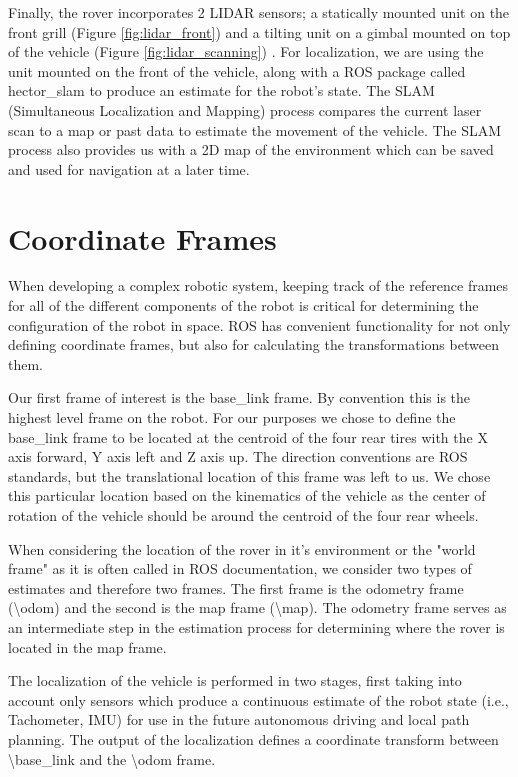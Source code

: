 Finally, the rover incorporates 2 LIDAR sensors; a statically mounted unit on the front grill (Figure \ref{fig:lidar_front}) and a tilting unit on a gimbal mounted on top of the vehicle (Figure \ref{fig:lidar_scanning}) . For localization, we are using the unit mounted on the front of the vehicle, along with a ROS package called hector\_slam to produce an estimate for the robot's state. The SLAM (Simultaneous Localization and Mapping) process compares the current laser scan to a map or past data to estimate the movement of the vehicle. The SLAM process also provides us with a 2D map of the environment which can be saved and used for navigation at a later time.

\section{Coordinate Frames}

When developing a complex robotic system, keeping track of the reference frames for all of the different components of the robot is critical for determining the configuration of the robot in space. ROS has convenient functionality for not only defining coordinate frames, but also for calculating the transformations between them. 

Our first frame of interest is the base\_link frame. By convention this is the highest level frame on the robot. For our purposes we chose to define the base\_link frame to be located at the centroid of the four rear tires with the X axis forward, Y axis left and Z axis up. The direction conventions are ROS standards, but the translational location of this frame was left to us. We chose this particular location based on the kinematics of the vehicle as the center of rotation of the vehicle should be around the centroid of the four rear wheels. 

When considering the location of the rover in it's environment or the "world frame" as it is often called in ROS documentation, we consider two types of estimates and therefore two frames. The first frame is the odometry frame (\textbackslash odom) and the second is the map frame (\textbackslash map). The odometry frame serves as an intermediate step in the estimation process for determining where the rover is located in the map frame.

The localization of the vehicle is performed in two stages, first taking into account only sensors which produce a continuous estimate of the robot state (i.e., Tachometer, IMU) for use in the future autonomous driving and local path planning. The output of the localization defines a coordinate transform between \textbackslash base\_link and the \textbackslash odom frame.

